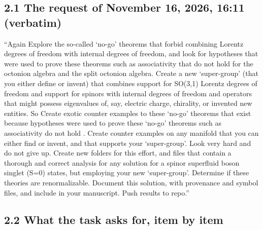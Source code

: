 \documentclass[
  10pt,
]{article}
\begin{document}
\hypertarget{the-request-of-november-16-2026-1611-verbatim}{%
\subsection{2.1 The request of November 16, 2026, 16:11
(verbatim)}\label{the-request-of-november-16-2026-1611-verbatim}}

``Again Explore the so-called `no-go' theorems that forbid combining
Lorentz degrees of freedom with internal degrees of freedom, and look
for hypotheses that were used to prove these theorems such as
associativity that do not hold for the octonion algebra and the split
octonion algebra. Create a new `super-group' (that you either define or
invent) that combines support for SO(3,1) Lorentz degrees of freedom and
support for spinors with internal degrees of freedom and operators that
might possess eigenvalues of, say, electric charge, chirality, or
invented new entities. So Create exotic counter examples to these
`no-go' theorems that exist because hypotheses were used to prove these
`no-go' theorems such as associativity do not hold . Create counter
examples on any manifold that you can either find or invent, and that
supports your `super-group'. Look very hard and do not give up. Create
new folders for this effort, and files that contain a thorough and
correct analysis for any solution for a spinor superfluid boson singlet
(S=0) states, but employing your new `super-group'. Determine if these
theories are renormalizable. Document this solution, with provenance and
symbol files, and include in your manuscript. Push results to repo.''

\hypertarget{what-the-task-asks-for-item-by-item}{%
\subsection{2.2 What the task asks for, item by
item}\label{what-the-task-asks-for-item-by-item}}
\end{document}
